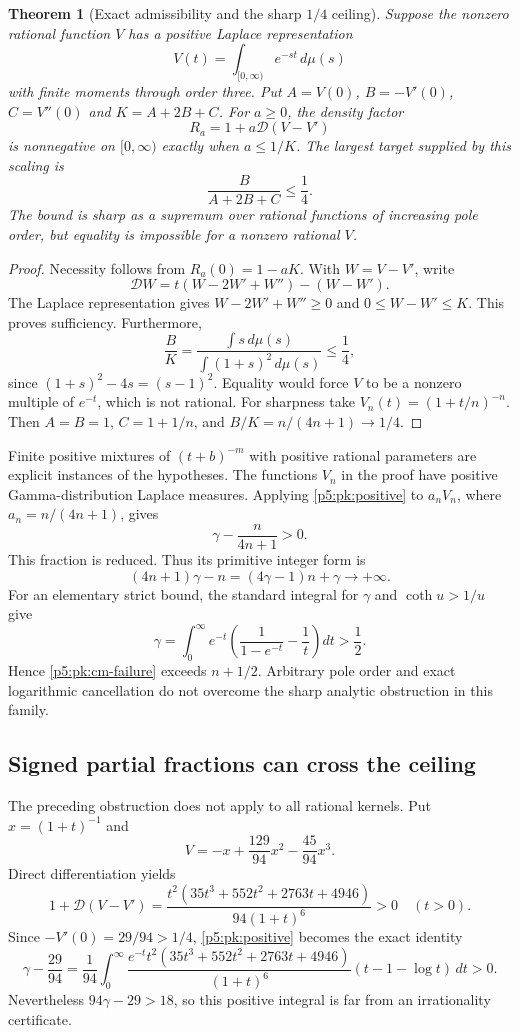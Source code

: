 \documentclass[11pt,a4paper]{article}
\newtheorem{theorem}{Theorem}[section]
\theoremstyle{definition}
\theoremstyle{remark}
\numberwithin{equation}{section}
\begin{document}
\begin{theorem}[Exact admissibility and the sharp $1/4$ ceiling]
\label{p5:pk:cm}
Suppose the nonzero rational function $V$ has a positive Laplace
representation
\[
 V(t)=\int_{[0,\infty)}e^{-st}\,d\mu(s)
\]
with finite moments through order three. Put
$A=V(0)$, $B=-V'(0)$, $C=V''(0)$ and $K=A+2B+C$.
For $a\ge0$, the density factor
\[
 R_a=1+a\mathcal D(V-V')
\]
is nonnegative on $[0,\infty)$ exactly when $a\le1/K$.
The largest target supplied by this scaling is
\[
 \frac{B}{A+2B+C}\le\frac14.
\]
The bound is sharp as a supremum over rational functions of increasing
pole order, but equality is impossible for a nonzero rational $V$.
\end{theorem}
\begin{proof}
Necessity follows from $R_a(0)=1-aK$. With $W=V-V'$, write
\[
 \mathcal D W=t(W-2W'+W'')-(W-W').
\]
The Laplace representation gives $W-2W'+W''\ge0$ and
$0\le W-W'\le K$. This proves sufficiency. Furthermore,
\[
 \frac{B}{K}
 =\frac{\int s\,d\mu(s)}{\int(1+s)^2\,d\mu(s)}\le\frac14,
\]
since $(1+s)^2-4s=(s-1)^2$. Equality would force $V$ to be a
nonzero multiple of $e^{-t}$, which is not rational.
For sharpness take $V_n(t)=(1+t/n)^{-n}$. Then $A=B=1$,
$C=1+1/n$, and $B/K=n/(4n+1)\to1/4$.
\end{proof}
Finite positive mixtures of $(t+b)^{-m}$ with positive rational
parameters are explicit instances of the hypotheses. The functions
$V_n$ in the proof have positive Gamma-distribution Laplace measures.
Applying \eqref{p5:pk:positive} to $a_nV_n$, where $a_n=n/(4n+1)$, gives
\[
 \gamma-\frac{n}{4n+1}>0.
\]
This fraction is reduced. Thus its primitive integer form is
\begin{equation}
 (4n+1)\gamma-n=(4\gamma-1)n+\gamma\longrightarrow+\infty.
 \label{p5:pk:cm-failure}
\end{equation}
For an elementary strict bound, the standard integral for $\gamma$ and
$\coth u>1/u$ give
\[
 \gamma=\int_0^\infty e^{-t}
       \left(\frac1{1-e^{-t}}-\frac1t\right)dt>\frac12.
\]
Hence \eqref{p5:pk:cm-failure} exceeds $n+1/2$. Arbitrary pole order and
exact logarithmic cancellation do not overcome the sharp analytic
obstruction in this family.

\subsection{Signed partial fractions can cross the ceiling}
The preceding obstruction does not apply to all rational kernels. Put
$x=(1+t)^{-1}$ and
\[
 V=-x+\frac{129}{94}x^2-\frac{45}{94}x^3.
\]
Direct differentiation yields
\[
 1+\mathcal D(V-V')
 =\frac{t^2(35t^3+552t^2+2763t+4946)}{94(1+t)^6}>0\quad(t>0).
\]
Since $-V'(0)=29/94>1/4$, \eqref{p5:pk:positive} becomes the exact identity
\begin{equation}
 \gamma-\frac{29}{94}
 =\frac1{94}\int_0^\infty
 \frac{e^{-t}t^2(35t^3+552t^2+2763t+4946)}{(1+t)^6}
       (t-1-\log t)\,dt>0.\label{p5:pk:explicit}
\end{equation}
Nevertheless $94\gamma-29>18$, so this positive integral is far from
an irrationality certificate.
\end{document}
